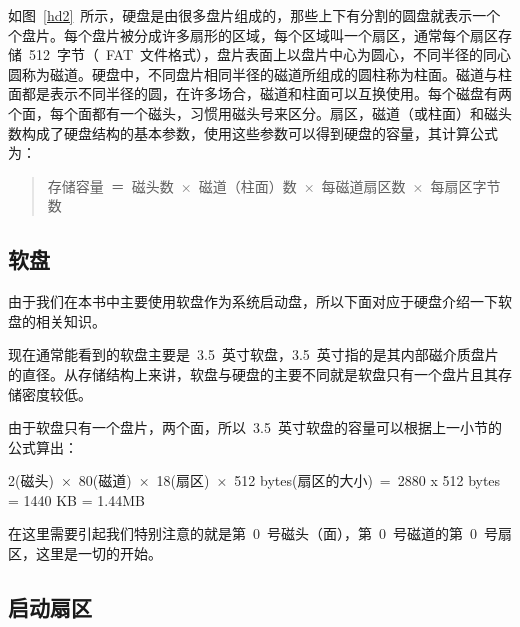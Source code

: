 如图~\ref{hd2}~所示，硬盘是由很多盘片组成的，那些上下有分割的圆盘就表示一个个盘片。每个盘片被分成许多扇形的区域，每个区域叫一个扇区，通常每个扇区存储~512~字节（~FAT~文件格式），盘片表面上以盘片中心为圆心，不同半径的同心圆称为磁道。硬盘中，不同盘片相同半径的磁道所组成的圆柱称为柱面。磁道与柱面都是表示不同半径的圆，在许多场合，磁道和柱面可以互换使用。每个磁盘有两个面，每个面都有一个磁头，习惯用磁头号来区分。扇区，磁道（或柱面）和磁头数构成了硬盘结构的基本参数，使用这些参数可以得到硬盘的容量，其计算公式为：
\begin{quote}
存储容量~＝~磁头数~×~磁道（柱面）数~×~每磁道扇区数~×~每扇区字节数
\end{quote}


\subsection{软盘}
由于我们在本书中主要使用软盘作为系统启动盘，所以下面对应于硬盘介绍一下软盘的相关知识。


现在通常能看到的软盘主要是~3.5~英寸软盘，3.5~英寸指的是其内部磁介质盘片的直径。从存储结构上来讲，软盘与硬盘的主要不同就是软盘只有一个盘片且其存储密度较低。

由于软盘只有一个盘片，两个面，所以~3.5~英寸软盘的容量可以根据上一小节的公式算出：

2(磁头)~×~80(磁道)~×~18(扇区)~×~512 bytes(扇区的大小)~=~2880 x 512 bytes = 1440 KB = 1.44MB

在这里需要引起我们特别注意的就是第~0~号磁头（面），第~0~号磁道的第~0~号扇区，这里是一切的开始。

\subsection{启动扇区}

